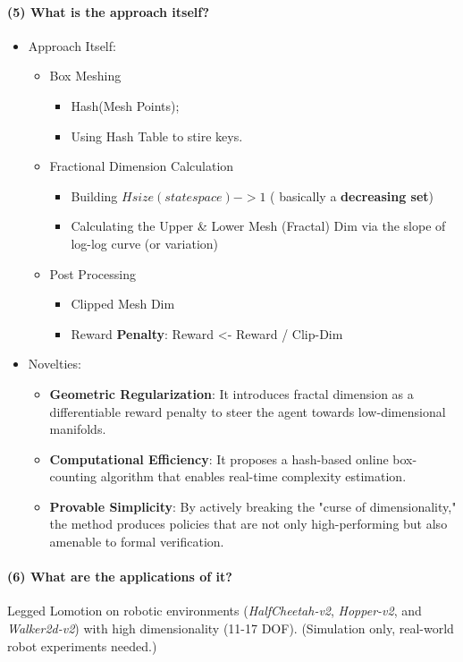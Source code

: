 \documentclass{article}
\begin{document}
\paragraph{(5) What is the approach itself?}
\begin{itemize}
  \item Approach Itself:
  \begin{itemize}
    \item Box Meshing
    \begin{itemize}
      \item Hash(Mesh Points);
      \item Using Hash Table to stire keys.
    \end{itemize}
    \item Fractional Dimension Calculation
    \begin{itemize}
      \item Building ${H{size(state space) -> 1}}$ ( basically a \textbf{decreasing set})
      \item Calculating the Upper \& Lower Mesh (Fractal) Dim via the slope of log-log curve (or variation)
    \end{itemize}
    \item Post Processing
    \begin{itemize}
      \item Clipped Mesh Dim
      \item Reward \textbf{Penalty}: Reward <- Reward / Clip-Dim
    \end{itemize}
  \end{itemize}
  \item Novelties:
  \begin{itemize}
    \item \textbf{Geometric Regularization}: It introduces fractal dimension as a differentiable reward penalty to steer the agent towards low-dimensional manifolds.
    \item \textbf{Computational Efficiency}: It proposes a hash-based online box-counting algorithm that enables real-time complexity estimation.
    \item \textbf{Provable Simplicity}: By actively breaking the "curse of dimensionality," the method produces policies that are not only high-performing but also amenable to formal verification.
  \end{itemize}
\end{itemize}

\paragraph{(6) What are the applications of it?} 
Legged Lomotion on robotic environments (\textit{HalfCheetah-v2}, \textit{Hopper-v2}, and \textit{Walker2d-v2}) with  high dimensionality (11-17 DOF). (Simulation only, real-world robot experiments needed.)
\end{document}
